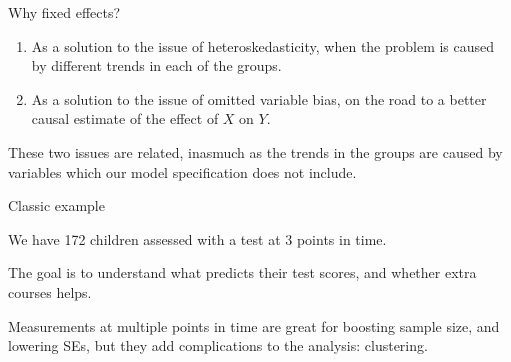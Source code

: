 \documentclass[12pt,english,pdf,xcolor=dvipsnames,aspectratio=169,handout]{beamer}\usepackage[]{graphicx}\usepackage[]{xcolor}
\begin{document}
\begin{frame}{Why fixed effects?}

\begin{enumerate}
\item As a solution to the issue of heteroskedasticity, when the problem is caused by different trends in each of the groups.
\item As a solution to the issue of omitted variable bias, on the road to a better causal estimate of the effect of $X$ on $Y$.
\end{enumerate}\bigskip

These two issues are related, inasmuch as the trends in the groups are caused by variables which our model specification does not include.

\end{frame}


\begin{frame}{Classic example}

We have 172 children assessed with a test at 3 points in time.\bigskip

The goal is to understand what predicts their test scores, and whether extra courses helps.\bigskip

Measurements at multiple points in time are great for boosting sample size, and lowering SEs, but they add complications to the analysis: clustering.

\end{frame}
\end{document}
